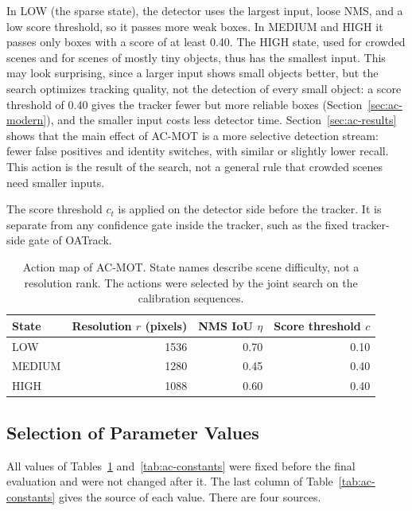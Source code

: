 In LOW (the sparse state), the detector uses the largest input, loose NMS, and a low score threshold, so it passes more weak boxes. In MEDIUM and HIGH it passes only boxes with a score of at least 0.40. The HIGH state, used for crowded scenes and for scenes of mostly tiny objects, thus has the smallest input. This may look surprising, since a larger input shows small objects better, but the search optimizes tracking quality, not the detection of every small object: a score threshold of 0.40 gives the tracker fewer but more reliable boxes (Section~\ref{sec:ac-modern}), and the smaller input costs less detector time. Section~\ref{sec:ac-results} shows that the main effect of AC-MOT is a more selective detection stream: fewer false positives and identity switches, with similar or slightly lower recall. This action is the result of the search, not a general rule that crowded scenes need smaller inputs.

The score threshold $c_t$ is applied on the detector side before the tracker. It is separate from any confidence gate inside the tracker, such as the fixed tracker-side gate of OATrack.

\begin{table}[tbp]
\centering
\caption{Action map of AC-MOT. State names describe scene difficulty, not a resolution rank. The actions were selected by the joint search on the calibration sequences.}
\label{tab:ac-actions}
\begin{tabular}{lrrr}
\toprule
State & Resolution $r$ (pixels) & NMS IoU $\eta$ & Score threshold $c$\\
\midrule
LOW & 1536 & 0.70 & 0.10\\
MEDIUM & 1280 & 0.45 & 0.40\\
HIGH & 1088 & 0.60 & 0.40\\
\bottomrule
\end{tabular}
\end{table}

\subsection{Selection of Parameter Values}\label{sec:ac-constants}
All values of Tables~\ref{tab:ac-actions} and~\ref{tab:ac-constants} were fixed before the final evaluation and were not changed after it. The last column of Table~\ref{tab:ac-constants} gives the source of each value. There are four sources.

